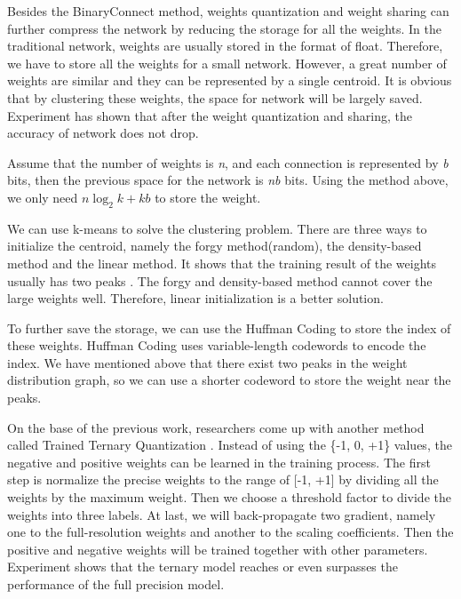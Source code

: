 \documentclass[a4paper]{article}
\begin{document}
\par Besides the BinaryConnect method, weights quantization and weight sharing can further compress the network by reducing the storage for all the weights. In the traditional network, weights are usually stored in the format of float. Therefore, we have to store all the weights for a small network. However, a great number of weights are similar and they can be represented by a single centroid. It is obvious that by clustering these weights, the space for network will be largely saved. Experiment \cite{deepcompress} has shown that after the weight quantization and sharing, the accuracy of network does not drop. 
\par Assume that  the number of weights is \emph{n}, and each connection is represented by \emph{b} bits, then the previous space for the network is \emph{nb} bits. Using the method above, we only need \emph{$n\log_2k+kb$}  to store the weight.
\par We can use k-means to solve the clustering problem. There are three ways to initialize the centroid, namely the forgy method(random), the density-based method and the linear method. It shows that the training result of the weights usually has two peaks \cite{deepcompress}. The forgy and density-based method cannot cover the large weights well. Therefore, linear initialization is a better solution. 
\par To further save the storage, we can use the Huffman Coding to store the index of these weights. Huffman Coding uses variable-length codewords to encode the index. We have mentioned above that there exist two peaks in the weight distribution graph, so we can use a shorter codeword to store the weight near the peaks. 



\par On the base of the previous work, researchers come up with another method called Trained Ternary Quantization \cite{ternary}. Instead of using the \{-1, 0, +1\} values, the negative and positive weights can be learned in the training process. The first step is normalize the precise weights to the range of [-1, +1] by dividing all the weights by the maximum weight. Then we choose a threshold factor to divide the weights into three labels. At last, we will back-propagate two gradient, namely one to the full-resolution weights and another to the scaling coefficients. Then the positive and negative weights will be trained together with other parameters. Experiment shows that the ternary model reaches or even surpasses the performance of the full precision model. 
\end{document}
